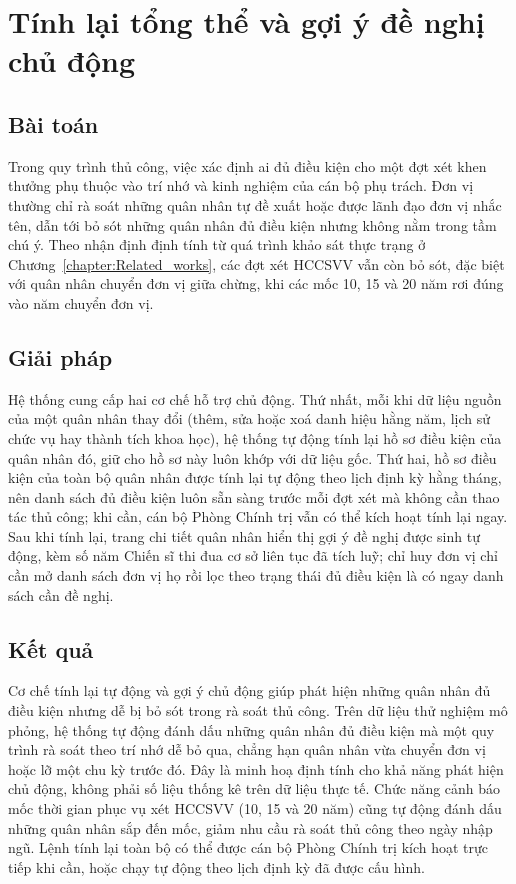 \documentclass[../DoAn.tex]{subfiles}
\begin{document}
\section{Tính lại tổng thể và gợi ý đề nghị chủ động}
\label{section:5.3}

\subsection{Bài toán}
Trong quy trình thủ công, việc xác định ai đủ điều kiện cho một đợt xét khen thưởng phụ thuộc vào trí nhớ và kinh nghiệm của cán bộ phụ trách.
Đơn vị thường chỉ rà soát những quân nhân tự đề xuất hoặc được lãnh đạo đơn vị nhắc tên, dẫn tới bỏ sót những quân nhân đủ điều kiện nhưng không nằm trong tầm chú ý.
Theo nhận định định tính từ quá trình khảo sát thực trạng ở Chương~\ref{chapter:Related_works}, các đợt xét HCCSVV vẫn còn bỏ sót, đặc biệt với quân nhân chuyển đơn vị giữa chừng, khi các mốc 10, 15 và 20 năm rơi đúng vào năm chuyển đơn vị.

\subsection{Giải pháp}
Hệ thống cung cấp hai cơ chế hỗ trợ chủ động.
Thứ nhất, mỗi khi dữ liệu nguồn của một quân nhân thay đổi (thêm, sửa hoặc xoá danh hiệu hằng năm, lịch sử chức vụ hay thành tích khoa học), hệ thống tự động tính lại hồ sơ điều kiện của quân nhân đó, giữ cho hồ sơ này luôn khớp với dữ liệu gốc.
Thứ hai, hồ sơ điều kiện của toàn bộ quân nhân được tính lại tự động theo lịch định kỳ hằng tháng, nên danh sách đủ điều kiện luôn sẵn sàng trước mỗi đợt xét mà không cần thao tác thủ công; khi cần, cán bộ Phòng Chính trị vẫn có thể kích hoạt tính lại ngay.
Sau khi tính lại, trang chi tiết quân nhân hiển thị gợi ý đề nghị được sinh tự động, kèm số năm Chiến sĩ thi đua cơ sở liên tục đã tích luỹ; chỉ huy đơn vị chỉ cần mở danh sách đơn vị họ rồi lọc theo trạng thái đủ điều kiện là có ngay danh sách cần đề nghị.

\subsection{Kết quả}
Cơ chế tính lại tự động và gợi ý chủ động giúp phát hiện những quân nhân đủ điều kiện nhưng dễ bị bỏ sót trong rà soát thủ công.
Trên dữ liệu thử nghiệm mô phỏng, hệ thống tự động đánh dấu những quân nhân đủ điều kiện mà một quy trình rà soát theo trí nhớ dễ bỏ qua, chẳng hạn quân nhân vừa chuyển đơn vị hoặc lỡ một chu kỳ trước đó.
Đây là minh hoạ định tính cho khả năng phát hiện chủ động, không phải số liệu thống kê trên dữ liệu thực tế.
Chức năng cảnh báo mốc thời gian phục vụ xét HCCSVV (10, 15 và 20 năm) cũng tự động đánh dấu những quân nhân sắp đến mốc, giảm nhu cầu rà soát thủ công theo ngày nhập ngũ.
Lệnh tính lại toàn bộ có thể được cán bộ Phòng Chính trị kích hoạt trực tiếp khi cần, hoặc chạy tự động theo lịch định kỳ đã được cấu hình.
\end{document}
